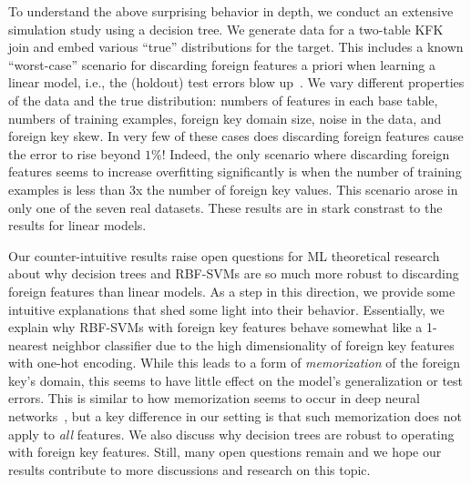 \documentclass{vldb}
\newcommand{\eat}[1]{}
\begin{document}
To understand the above surprising behavior in depth, we conduct an extensive simulation study using a decision tree. We generate data for a two-table KFK join 
and embed various ``true'' distributions for the target. This includes a known ``worst-case'' scenario for discarding foreign features a priori when learning a linear model, 
i.e., the (holdout) test errors blow up~\cite{hamlet}. We vary different properties of the data and the true distribution: 
numbers of features in each base table, numbers of training examples, foreign key domain size, noise in the data, and foreign key skew. 
In very few of these cases does discarding foreign features cause the error to rise beyond $1\%$! Indeed, the only scenario where discarding foreign features seems to increase 
overfitting significantly is when the number of training examples is less than $3$x the number of foreign key values. This scenario arose in only one of the seven real datasets.
These results are in stark constrast to the results for linear models.

Our counter-intuitive results raise open questions for ML theoretical research about why decision trees and RBF-SVMs are so much more robust to discarding foreign features
than linear models. As a step in this direction, we provide some intuitive explanations that shed some light into their behavior. 
Essentially, we explain why RBF-SVMs with foreign key features behave somewhat like a 1-nearest neighbor classifier due to the high dimensionality of foreign key features with 
one-hot encoding. While this leads to a form of \textit{memorization} of the foreign key's domain, this seems to have little effect on the model's generalization or test errors.
This is similar to how memorization seems to occur in deep neural networks~\cite{rechtdnn}, but a key difference in our setting is that such memorization does not apply to
\textit{all} features. We also discuss why decision trees are robust to operating with foreign key features. 
Still, many open questions remain and we hope our results contribute to more discussions and research on this topic.

\eat{
We extend the worst-case simulation scenario for linear models by replicating the foreign feature that determines the target multiple times. The idea is to make a model that uses 
the foreign key feature alone to overfit more than one that uses the foreign features. In particular, for the RBF-SVM, this scenario demonstrates that it behaves 
more similarly to a 1-nearest neighbor classifier when using the foreign key feature but less so when the number of relevant foreign features are increased.
}
\end{document}
